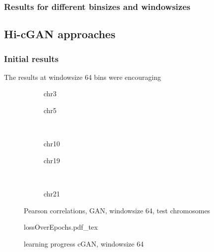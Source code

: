 \subsubsection{Results for different binsizes and windowsizes}

\subsection{Hi-cGAN approaches}
\subsubsection{Initial results}
The results at windowsize 64 bins were encouraging \xxx
\begin{figure}[p]
    \begin{subfigure}{0.45\textwidth}
        \scriptsize
        \caption{chr3}
    \end{subfigure} \hfill
    \begin{subfigure}{0.45\textwidth}
        \scriptsize
        \caption{chr5}
    \end{subfigure}\\[5mm]
    \begin{subfigure}{0.45\textwidth}
        \scriptsize
        \caption{chr10}
    \end{subfigure}\hfill
    \begin{subfigure}{0.45\textwidth}
        \scriptsize
        \caption{chr19}
    \end{subfigure}\\[3mm]
    \centering
    \begin{subfigure}{0.45\textwidth}
        \scriptsize
        \caption{chr21}
    \end{subfigure}
    \caption{Pearson correlations, GAN, windowsize 64, test chromosomes}
    \label{fig:results:GAN64_pearson}
\end{figure}
\begin{figure}[hbp]
 \centering
 \scriptsize
 {lossOverEpochs.pdf_tex}
 \caption{learning progress cGAN, windowsize 64} \label{fig:results:GAN64_lossEpochs}
\end{figure}
